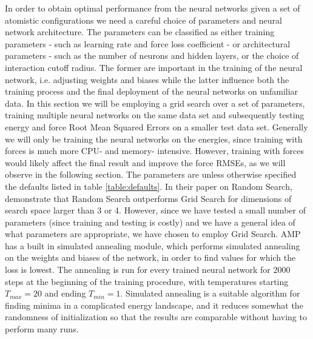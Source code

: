 In order to obtain optimal performance from the neural networks
given a set of atomistic configurations we need a careful choice of parameters
and neural network architecture. The parameters can be classified as either
training parameters - such as learning rate and force loss coefficient -
or architectural parameters - such as the number of neurons and hidden layers,
or the choice of interaction cutoff radius. The former are important
in the training of the neural network, i.e. adjusting weights and biases
while the latter influence both the training process and the final
deployment of the neural networks on unfamiliar data.
In this section we will be employing a grid search over a set of
parameters, training multiple neural networks on the same data set
and subsequently testing energy and force Root Mean Squared Errors on
a smaller test data set. Generally we will only be training the neural networks
on the energies, since training with forces is much more CPU- and memory-
intensive. However, training with forces would likely affect the final
result and improve the force RMSEs, as we will observe in the following section.
The parameters are unless otherwise specified the defaults listed
in table \ref{table:defaults}.
In their paper on Random Search, \parencite[Bergstra and Bengio]{
    bergstra2012random}
demonstrate that Random Search outperforms Grid Search for dimensions
of search space larger than 3 or 4. However, since we have tested
a small number of parameters (since training and testing is costly)
and we have a general idea of what parameters are appropriate, we
have chosen to employ Grid Search.
AMP has a built in simulated annealing module, which performs
simulated annealing on the weights and biases of the network,
in order to find values for which the loss is lowest.
The annealing is run for every trained neural network
for 2000 steps at the beginning of the training procedure,
with temperatures starting $T_{max} = 20$ and ending $T_{min} = 1$.
Simulated annealing is a suitable algorithm for finding minima
in a complicated energy landscape, and it reduces somewhat
the randomness of initialization so that the results are comparable
without having to perform many runs.

